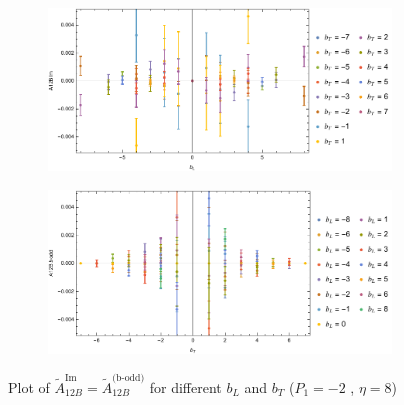 \documentclass[]{article}
\numberwithin{equation}{section}
\newcommand{\tAmp}{\widetilde{A}}
\newcommand{\tAmp}{\ensuremath{\widetilde{A}^{(+)}}}
\begin{document}
\begin{figure}[h!]
     \centering
     \begin{subfigure}[b]{0.45\textwidth}
         \centering
         \includegraphics[width=\textwidth]{Amp_plots/bL_A12B_b_odd_P1_-2_eta_8.pdf}
     \end{subfigure}
     \begin{subfigure}[b]{0.45\textwidth}
         \centering
         \includegraphics[width=\textwidth]{Amp_plots/bT_A12B_b_odd_P1_-2_eta_8.pdf}
     \end{subfigure}
        \caption{Plot of  $\tAmp^{\text{Im}}_{12B}=\tAmp^{\text{(b-odd)}}_{12B}$ for different $b_{L}$ and $b_{T}$  ($P_{1} = -2$ , $\eta=8$)}
\end{figure}
\end{document}

